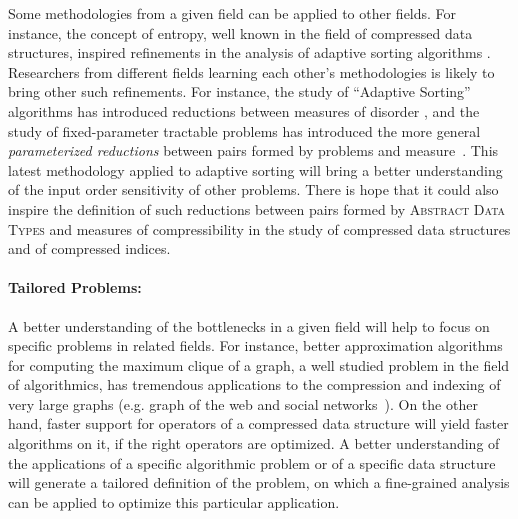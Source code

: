 \documentclass[a4paper,10pt]{article}
\begin{document}
Some methodologies from a given field can be applied to other fields.
%
For instance, the concept of entropy, well known in the field of compressed data structures, inspired refinements in the analysis of adaptive sorting algorithms \cite{2013-TCS-CompressedRepresentationsOfPermutationsAndApplications-BarbayNavarro}.
%
Researchers from different fields learning each other's methodologies is likely to bring other such refinements.
%
For instance, the study of ``Adaptive Sorting'' algorithms has introduced reductions between measures of disorder \cite{1992-ACJ-AnOverviewOfAdaptiveSorting-MoffatPetersson,1995-DAM-AFrameworkForAdaptiveSorting-PeterssonMoffat}, and the study of fixed-parameter tractable problems has introduced the more general \emph{parameterized reductions} between pairs formed by problems and measure~\cite{DowneyF13,CyganFKLMPPS15}. This latest methodology applied to adaptive sorting will bring a better understanding of the input order sensitivity of other problems. There is hope that it could also inspire the definition of such reductions between pairs formed by \textsc{Abstract Data Types} and measures of compressibility in the study of compressed data structures and of compressed indices.

\paragraph{Tailored Problems:}

A better understanding of the bottlenecks in a given field will help to focus on specific problems in related fields.
%
For instance, better approximation algorithms for computing the maximum clique of a graph, a well studied problem in the field of algorithmics, has tremendous applications to the compression and indexing of very large graphs (e.g. graph of the web and social networks~\cite{HNkais13}).
On the other hand, faster support for operators of a compressed data structure will yield faster algorithms on it, if the right operators are optimized.
%
A better understanding of the applications of a specific algorithmic problem or of a specific data structure will generate a tailored definition of the problem, on which a fine-grained analysis can be applied to optimize this particular application.
\end{document}
